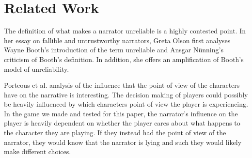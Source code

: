 \section{Related Work}
The definition of what makes a narrator unreliable is a highly contested point. In her essay on fallible and untrustworthy narrators, Greta Olson first analyses Wayne Booth's introduction of the term unreliable and Ansgar N\"unning's criticism of Booth's definition. In addition, she offers an amplification of Booth's model of unreliability\cite{Olson}.

Porteous et al. \cite{Porteous} analysis of the influence that the point of view of the characters have on the narrative is interesting. The decision making of players could possibly be heavily influenced by which characters point of view the player is experiencing. In the game we made and tested for this paper, the narrator's influence on the player is heavily dependent on whether the player cares about what happens to the character they are playing. If they instead had the point of view of the narrator, they would know that the narrator is lying and such they would likely make different choices.